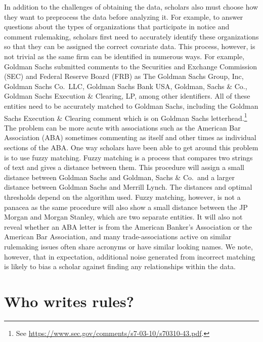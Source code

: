 \documentclass[
      12pt,
        ]{article}
\begin{document}
In addition to the challenges of obtaining the data, scholars also must
choose how they want to preprocess the data before analyzing it. For
example, to answer questions about the types of organizations that
participate in notice and comment rulemaking, scholars first need to
accurately identify these organizations so that they can be assigned the
correct covariate data. This process, however, is not trivial as the
same firm can be identified in numerous ways. For example, Goldman Sachs
submitted comments to the Securities and Exchange Commission (SEC) and
Federal Reserve Board (FRB) as The Goldman Sachs Group, Inc, Goldman
Sachs Co.~LLC, Goldman Sachs Bank USA, Goldman, Sachs \& Co., Goldman
Sachs Execution \& Clearing, LP, among other identifiers. All of these
entities need to be accurately matched to Goldman Sachs, including the
Goldman Sachs Execution \& Clearing comment which is on Goldman Sachs
letterhead.\footnote{See
  \url{https://www.sec.gov/comments/s7-03-10/s70310-43.pdf}.} The
problem can be more acute with associations such as the American Bar
Association (ABA) sometimes commenting as itself and other times as
individual sections of the ABA. One way scholars have been able to get
around this problem is to use fuzzy matching. Fuzzy matching is a
process that compares two strings of text and gives a distance between
them. This procedure will assign a small distance between Goldman Sachs
and Goldman, Sachs \& Co.~and a larger distance between Goldman Sachs
and Merrill Lynch. The distances and optimal thresholds depend on the
algorithm used. Fuzzy matching, however, is not a panacea as the same
procedure will also show a small distance between the JP Morgan and
Morgan Stanley, which are two separate entities. It will also not reveal
whether an ABA letter is from the American Banker's Association or the
American Bar Association, and many trade-associations active on similar
rulemaking issues often share acronyms or have similar looking names. We
note, however, that in expectation, additional noise generated from
incorrect matching is likely to bias a scholar against finding any
relationships within the data.

\hypertarget{who-writes-rules}{%
\section{Who writes rules?}\label{who-writes-rules}}
\end{document}
